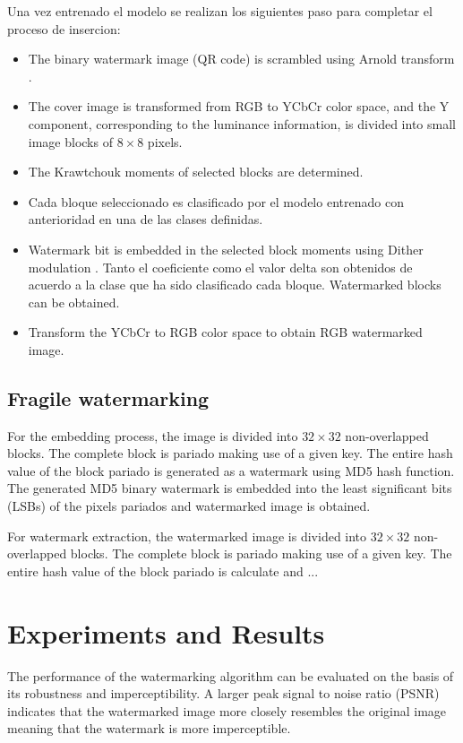 \documentclass[runningheads]{llncs}
\begin{document}
Una vez entrenado el modelo se realizan los siguientes paso para completar el proceso de insercion:

\begin{itemize}
	\item[\checkmark] The binary watermark image (QR code) is scrambled using Arnold transform \cite{Arnol'd:1987366}.
	\item[\checkmark] The cover image is transformed from RGB to YCbCr color space, and the Y component, corresponding to the luminance information, is divided into small image blocks of $8\times 8$ pixels.
	\item[\checkmark] The Krawtchouk moments \cite{Yap2003} of selected blocks are determined.
	\item[\checkmark] Cada bloque seleccionado es clasificado por el modelo entrenado con anterioridad en una de las clases definidas.
	\item[\checkmark] Watermark bit is embedded in the selected block moments using Dither modulation \cite{chen2001quantization}. Tanto el coeficiente como el valor delta son obtenidos de acuerdo a la clase que ha sido clasificado cada bloque. Watermarked blocks can be obtained. 
	\item[\checkmark] Transform the YCbCr to RGB color space to obtain RGB watermarked image.
\end{itemize}

\subsection{Fragile watermarking}
For the embedding process, the image is divided into $32\times 32$ non-overlapped blocks. The complete block is pariado making use of a given key. The entire hash value of the block pariado is generated as a watermark using MD5 hash function. The generated MD5 binary watermark is embedded into the least significant bits (LSBs) of the pixels pariados and watermarked image is obtained.

For watermark extraction, the watermarked image is divided into $32\times 32$ non-overlapped blocks. The complete block is pariado making use of a given key. The entire hash value of the block pariado is calculate and ...

\section{Experiments and Results}
The performance of the watermarking algorithm can be evaluated on the basis of its robustness and imperceptibility. A larger peak signal to noise ratio (PSNR) indicates that the watermarked image more closely resembles the original image meaning that the watermark is more imperceptible.
\end{document}
